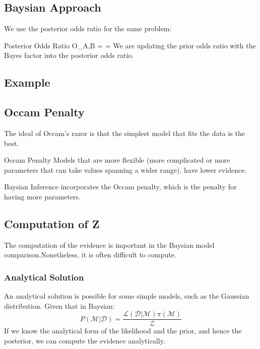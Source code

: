 \documentclass[12pt,a4paper]{article}
\begin{document}
\subsection{Baysian Approach}
We use the posterior odds ratio for the same problem:\\
\begin{definition}
    {Posterior Odds Ratio}
    {O_{A,B} =  =  }
    {We are updating the prior odds ratio with the Bayes factor into the posterior odds ratio.}
\end{definition}
\subsection{Example}

\subsection{Occam Penalty}
The ideal of Occam's razor is that the simplest model that fits the data is the best.\\
\begin{theorem}
    {Occam Penalty}
    {Models that are more flexible (more complicated or more parameters that can take values spanning a wider range), have lower evidence.}
\end{theorem}
Baysian Inference incorporates the Occam penalty, which is the penalty for having more parameters.\\

\subsection{Computation of Z}
The computation of the evidence is important in the Baysian model comparison.Nonetheless, it is often difficult to compute.\\
\subsubsection{Analytical Solution}
An analytical solution is possible for some simple models, such as the Gaussian distribution.
Given that in Baysian:
$$
    P(\mathcal{M}|\mathcal{D}) = \frac{\mathcal{L}(\mathcal{D}|\mathcal{M})\pi(\mathcal{M})}{\mathcal{Z}}
$$
If we know the analytical form of the likelihood and the prior, and hence the posterior, we can compute the evidence analytically.\\
\end{document}
